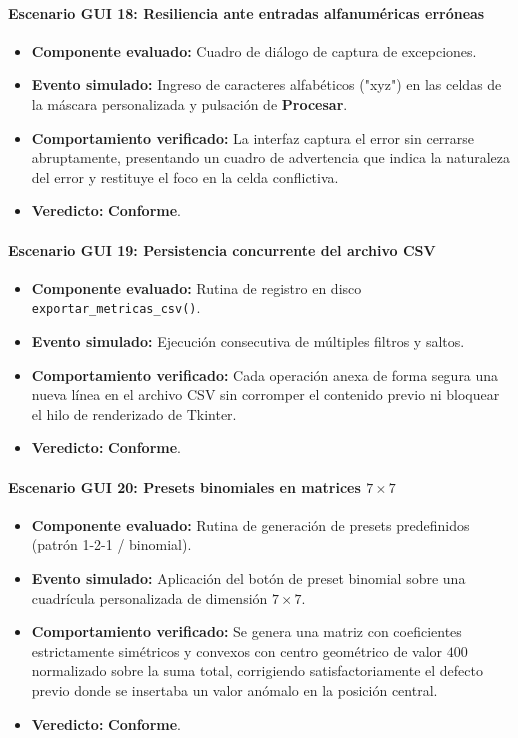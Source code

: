 \documentclass[11pt]{article}
\newcommand{\pruebaok}{\textcolor{verdeExito}{\textbf{Conforme}}}
\begin{document}
\paragraph{Escenario GUI 18: Resiliencia ante entradas alfanuméricas erróneas}
\begin{itemize}[itemsep=0.15em]
\item \textbf{Componente evaluado:} Cuadro de diálogo de captura de excepciones.
\item \textbf{Evento simulado:} Ingreso de caracteres alfabéticos ("xyz") en las celdas de la máscara personalizada y pulsación de \textbf{Procesar}.
\item \textbf{Comportamiento verificado:} La interfaz captura el error sin cerrarse abruptamente, presentando un cuadro de advertencia que indica la naturaleza del error y restituye el foco en la celda conflictiva.
\item \textbf{Veredicto:} \pruebaok.
\end{itemize}

\paragraph{Escenario GUI 19: Persistencia concurrente del archivo CSV}
\begin{itemize}[itemsep=0.15em]
\item \textbf{Componente evaluado:} Rutina de registro en disco \texttt{exportar\_metricas\_csv()}.
\item \textbf{Evento simulado:} Ejecución consecutiva de múltiples filtros y saltos.
\item \textbf{Comportamiento verificado:} Cada operación anexa de forma segura una nueva línea en el archivo CSV sin corromper el contenido previo ni bloquear el hilo de renderizado de Tkinter.
\item \textbf{Veredicto:} \pruebaok.
\end{itemize}

\paragraph{Escenario GUI 20: Presets binomiales en matrices $7\times7$}
\begin{itemize}[itemsep=0.15em]
\item \textbf{Componente evaluado:} Rutina de generación de presets predefinidos (patrón 1-2-1 / binomial).
\item \textbf{Evento simulado:} Aplicación del botón de preset binomial sobre una cuadrícula personalizada de dimensión $7\times7$.
\item \textbf{Comportamiento verificado:} Se genera una matriz con coeficientes estrictamente simétricos y convexos con centro geométrico de valor $400$ normalizado sobre la suma total, corrigiendo satisfactoriamente el defecto previo donde se insertaba un valor anómalo en la posición central.
\item \textbf{Veredicto:} \pruebaok.
\end{itemize}
\end{document}
